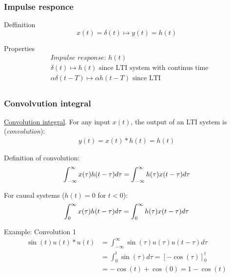 \subsubsection{Impulse responce}
Deffinition
\begin{equation*}
    x(t)=\delta(t) \mapsto y(t)=h(t)
\end{equation*}

Properties
\begin{align*}
    &\textit{Impulse response: } h(t) \\
    &\delta(t) \mapsto h(t) \text{ since LTI system with continus time}\\
    &\alpha\delta(t-T) \mapsto \alpha h(t-T) \text{ since LTI}\\
\end{align*}


\subsubsection{Convolvution integral}
\href{https://www.youtube.com/watch?v=35gc3GE4Ddo}{Convolution integral}.
For any input $x(t)$, the output of an LTI system is (\textit{convolution}):
\begin{align*}
    y(t) = x(t)*h(t) = h(t)
\end{align*}

\noindent Definition of convolution:
\begin{equation}
    \int_{-\infty}^{\infty}x(\tau)h(t-\tau)d\tau = \int_{-\infty}^{\infty}h(\tau)x(t-\tau)d\tau \\
\end{equation}

\noindent For causal systems ($h(t)=0$ for $t<0$):
\begin{equation}
    \int_{0}^{\infty}x(\tau)h(t-\tau)d\tau = \int_{0}^{\infty}h(\tau)x(t-\tau)d\tau \\
\end{equation}


\begin{exampleblock}{Example: Convolution 1}
\begin{align*}
    \sin(t)u(t)*u(t) &= \int_{-\infty}^{\infty} \sin(\tau)u(\tau)u(t-\tau)d\tau \\
    &= \int_{0}^{t} \sin(\tau)d\tau = [-\cos(\tau)]_0^t \\
    &= -\cos(t)+\cos(0) = 1- \cos(t) \\
\end{align*}    
\end{exampleblock}

